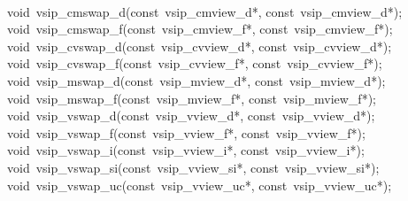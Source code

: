\\\cvsiplh
\begin{cfuncs}
void~vsip\_cmswap\_d(const~vsip\_cmview\_d*, const~vsip\_cmview\_d*);\\ 
void~vsip\_cmswap\_f(const~vsip\_cmview\_f*, const~vsip\_cmview\_f*);\\ 
void~vsip\_cvswap\_d(const~vsip\_cvview\_d*, const~vsip\_cvview\_d*);\\ 
void~vsip\_cvswap\_f(const~vsip\_cvview\_f*, const~vsip\_cvview\_f*);\\ 
void~vsip\_mswap\_d(const~vsip\_mview\_d*, const~vsip\_mview\_d*);\\ 
void~vsip\_mswap\_f(const~vsip\_mview\_f*, const~vsip\_mview\_f*);\\ 
void~vsip\_vswap\_d(const~vsip\_vview\_d*, const~vsip\_vview\_d*);\\ 
void~vsip\_vswap\_f(const~vsip\_vview\_f*, const~vsip\_vview\_f*);\\ 
void~vsip\_vswap\_i(const~vsip\_vview\_i*, const~vsip\_vview\_i*);\\ 
void~vsip\_vswap\_si(const~vsip\_vview\_si*, const~vsip\_vview\_si*);\\ 
void~vsip\_vswap\_uc(const~vsip\_vview\_uc*, const~vsip\_vview\_uc*);\\ 
\end{cfuncs}
\pyjvsiph
%
%
%
